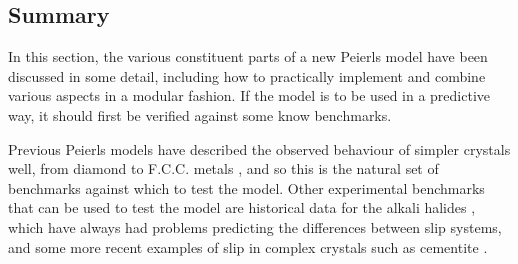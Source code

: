 \subsection{Summary}

In this section, the various constituent parts of a new Peierls model have been discussed in some detail, including how to practically implement and combine various aspects in a modular fashion. If the model is to be used in a predictive way, it should first be verified against some know benchmarks. 

Previous Peierls models have described the observed behaviour of simpler crystals well, from diamond to F.C.C. metals \cite{Bulatov1997,Clegg2006}, and so this is the natural set of benchmarks against which to test the model. Other experimental benchmarks that can be used to test the model are historical data for the alkali halides \cite{Haasen1985,Clegg2006}, which have always had problems predicting the differences between slip systems, and some more recent examples of slip in complex crystals such as cementite \cite{Stopher2017}.



















































